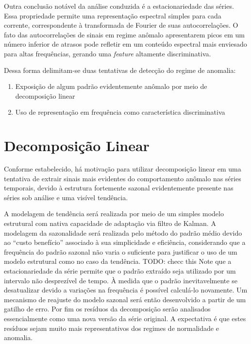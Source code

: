 Outra conclusão notável da análise conduzida é a estacionariedade das séries.
Essa propriedade permite uma representação espectral simples para cada
corrente, correspondente à transformada de Fourier de suas autocorrelações.
O fato das autocorrelações de sinais em regime anômalo apresentarem picos em
um número inferior de atrasos pode refletir em um conteúdo espectral mais
enviesado para altas frequências, gerando uma \emph{feature} altamente
discriminativa.

Dessa forma delimitam-se duas tentativas de detecção do regime de anomalia:

\begin{enumerate}
    \item Exposição de algum padrão evidentemente anômalo por meio de decomposição linear
    \item Uso de representação em frequência como característica discriminativa
\end{enumerate}

\section{Decomposição Linear}

Conforme estabelecido, há motivação para utilizar decomposição linear em uma
tentativa de extrair sinais mais evidentes do comportamento anômalo nas séries
temporais, devido à estrutura fortemente sazonal evidentemente presente nas
séries sob análise e uma visível tendência.

A modelagem de tendência será realizada por meio de um simples modelo
estrutural com nativa capacidade de adaptação via filtro de Kalman. A modelagem
da sazonalidade será realizada pelo método do padrão médio devido ao ``custo
benefício'' associado à sua simplicidade e eficiência, considerando que a
frequência do padrão sazonal não varia o suficiente para justificar o uso de
um modelo estrutural como no caso da tendência. TODO: checc this Note
que a estacionariedade da série permite que o padrão extraído seja utilizado
por um intervalo não desprezível de tempo. À medida que o padrão
inevitavelmente se desatualizar devido a variações na frequência é possível
calculá-lo novamente. Um mecanismo de reajuste do modelo sazonal será então
desenvolvido a partir de um gatilho de erro. Por fim os resíduos da
decomposição serão analisados essencialmente como uma nova versão da série
original. A expectativa é que estes resíduos sejam muito mais representativos
dos regimes de normalidade e anomalia.

